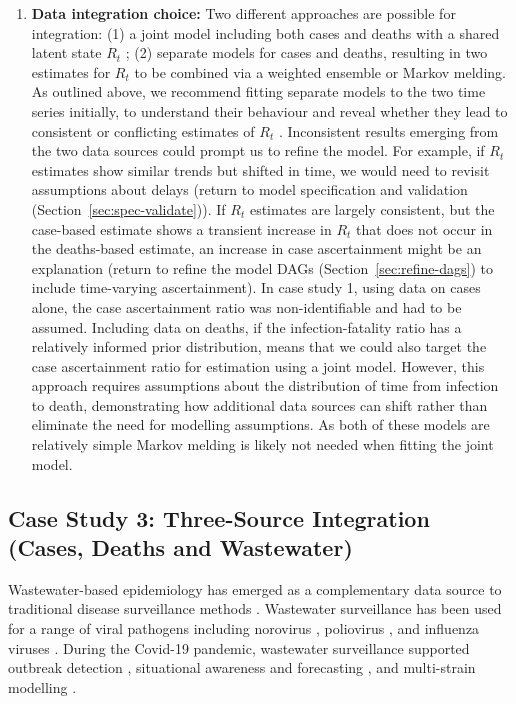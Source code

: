 \documentclass{article}
\begin{document}
\begin{enumerate}
    \item \textbf{Data integration choice:} 
       Two different approaches are possible for integration: (1) a joint model including both cases and deaths with a shared latent state $R_t$ \citep{scott2020epidemia}; (2) separate models for cases and deaths, resulting in two estimates for $R_t$ to be combined via a weighted ensemble or Markov melding.
        As outlined above, we recommend fitting separate models to the two time series initially, to understand their behaviour and reveal whether they lead to consistent or conflicting estimates of $R_t$ \citep{sherratt2021exploring}. Inconsistent results emerging from the two data sources could prompt us to refine the model. For example, if $R_t$ estimates show similar trends but shifted in time, we would need to revisit assumptions about delays (return to model specification and validation (Section~\ref{sec:spec-validate})). If $R_t$ estimates are largely consistent, but the case-based estimate shows a transient increase in $R_t$ that does not occur in the deaths-based estimate, an increase in case ascertainment might be an explanation (return to refine the model DAGs (Section~\ref{sec:refine-dags}) to include time-varying ascertainment). In case study 1, using data on cases alone, the case ascertainment ratio was non-identifiable and had to be assumed. Including data on deaths, if the infection-fatality ratio has a relatively informed prior distribution, means that we could also target the case ascertainment ratio for estimation using a joint model. However, this approach requires assumptions about the distribution of time from infection to death, demonstrating how additional data sources can shift rather than eliminate the need for modelling assumptions. As both of these models are relatively simple Markov melding is likely not needed when fitting the joint model.
\end{enumerate}

\subsection{Case Study 3: Three-Source Integration (Cases, Deaths and Wastewater)}

Wastewater-based epidemiology has emerged as a complementary data source to traditional disease surveillance methods \citep{keshaviah2023wastewater}. Wastewater surveillance has been used for a range of viral pathogens including norovirus \citep{zheng2024tracking}, poliovirus \citep{whitehouse2024wastewater}, and influenza viruses \citep{zheng2023development}. During the Covid-19 pandemic, wastewater surveillance supported outbreak detection \citep{hewitt2022sensitivity}, situational awareness and forecasting \citep{varkila2023use,jin2024combining}, and multi-strain modelling \citep{dreifuss2025estimated}. 
\end{document}
